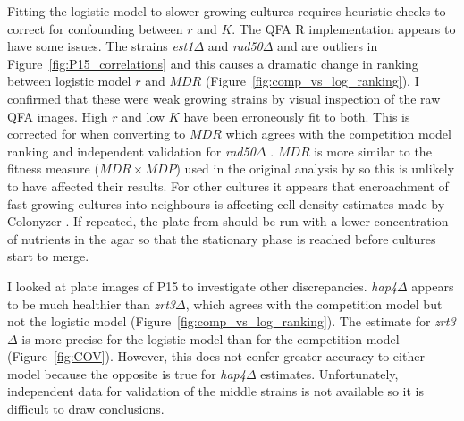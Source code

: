 Fitting the logistic model to slower growing cultures requires
heuristic checks to correct for confounding between \(r\) and
\(K\). The QFA R implementation appears to have some issues. The
strains \textit{est1\(\Delta\)} and \textit{rad50\(\Delta\)} and are
outliers in Figure~\ref{fig:P15_correlations} and this causes a
dramatic change in ranking between logistic model \(r\) and \(MDR\)
(Figure~\ref{fig:comp_vs_log_ranking}). I confirmed that these were
weak growing strains by visual inspection of the raw QFA images. High
\(r\) and low \(K\) have been erroneously fit to both. This is
corrected for when converting to \(MDR\) which agrees with the
competition model ranking and independent validation for
\textit{rad50\(\Delta\)} \citep{zubko2004exo1}. \(MDR\) is more
similar to the fitness measure (\(MDR \times MDP\)) used in the
original analysis by \citet{Addinall2011} so this is unlikely to have
affected their results. For other cultures it appears that
encroachment of fast growing cultures into neighbours is affecting
cell density estimates made by Colonyzer \citep{Lawless2010}. If
repeated, the plate from \citet{Addinall2011} should be run with a
lower concentration of nutrients in the agar so that the stationary
phase is reached before cultures start to merge.

I looked at plate images of P15 to investigate other discrepancies.
\textit{hap4\(\Delta\)} appears to be much healthier than
\textit{zrt3\(\Delta\)}, which agrees with the competition model but
not the logistic model (Figure~\ref{fig:comp_vs_log_ranking}). The
estimate for \textit{zrt3\(\Delta\)} is more precise for the logistic
model than for the competition model (Figure~\ref{fig:COV}). However,
this does not confer greater accuracy to either model because the
opposite is true for \textit{hap4\(\Delta\)} estimates. Unfortunately,
independent data for validation of the middle strains is not available
so it is difficult to draw conclusions.

